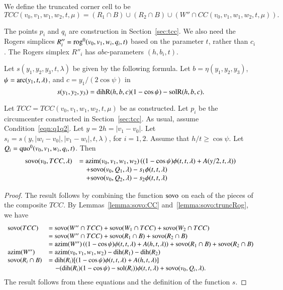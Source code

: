 \begin{definition} We define the truncated corner cell
to be
$$
TCC(v_0,v_1,w_1,w_2,t,\mu) =
(R_1\cap B)\cup (R_2\cap B) \cup (W''\cap CC(v_0,v_1,w_1,w_2,t,\mu)).
$$
\end{definition}

The points $p_i$ and
 $q_i$ are construction in Section~\ref{sec:tcc}.
We also need the Rogers simplices 
$R''_i= {\operatorname{rog}}^0(v_0,v_1,w_i,q_i,t)$ based on the parameter
$t$, rather than $c_i$.  The Rogers simplex $R''_i$
has $abc$-parameters
$(h,b_i,t)$.  

Let $s(y_1,y_2,y_3,t,\lambda)$ be given by the following formula.
Let $b = \eta(y_1,y_2,y_3)$, $\psi = \operatorname{arc}(y_1,t,\lambda)$,
and $c = y_1/(2\cos\psi)$ in
  $$
  s(y_1,y_2,y_3) = {\operatorname{dihR}}(h,b,c) (1-\cos\psi) - {\operatorname{solR}}(h,b,c).
  $$


\begin{lemma}\label{lemma:tcc}  
Let $TCC=TCC(v_0,v_1,w_1,w_2,t,\mu)$ be as constructed.
Let $p_i$ be the circumcenter constructed in Section~\ref{sec:tcc}.
As usual, assume Condition~\ref{eqn:q1q2}.  
Let $y = 2h = |v_1-v_0|$.  
Let $s_i = s(y,|w_i-v_0|,|v_1-w_i|,t,\lambda)$, for $i=1,2$.
Assume that
$h/t \ge \cos\psi$.  
Let $Q_i = {\operatorname{quo}}^0(v_0,v_1,w_i,q_i,t)$.  Then
  \begin{equation}\label{eqn:tcc}
  \begin{array}{lll}
  {\operatorname{sovo}}(v_0,TCC,\lambda) &= 
  {\operatorname{azim}}(v_0,v_1,w_1,w_2) \left((1-\cos\psi)\phi(t,t,\lambda)+
    A(y/2,t,\lambda)\right) \\
    &\quad + {\operatorname{sovo}}(v_0,Q_1,\lambda) - s_1\phi(t,t,\lambda) \\
    &\quad + {\operatorname{sovo}}(v_0,Q_2,\lambda) - s_2\phi(t,t,\lambda) \\
  \end{array}
  \end{equation}
\end{lemma}

\begin{proof}  The result follows by combining the function
${\operatorname{sovo}}$ on each of the pieces of the composite $TCC$.
By Lemmas~\ref{lemma:sovo:CC} and~\ref{lemma:sovo:truncRog},  
we have
$$
\begin{array}{lll}
  {\operatorname{sovo}}(TCC) &= {\operatorname{sovo}}(W''\cap TCC) + {\operatorname{sovo}}(W_1\cap TCC)
  + {\operatorname{sovo}}(W_2\cap TCC)\\
  &={\operatorname{sovo}}(W''\cap TCC) + {\operatorname{sovo}}(R_1\cap B)
  + {\operatorname{sovo}}(R_2\cap B)\\
  &= {\operatorname{azim}}(W'') \left((1-\cos\psi)\phi(t,t,\lambda)+
    A(h,t,\lambda)\right) 
   + {\operatorname{sovo}}(R_1\cap B)
  + {\operatorname{sovo}}(R_2\cap B)\\
  {\operatorname{azim}}(W'') &= {\operatorname{azim}}(v_0,v_1,w_1,w_2)-\operatorname{dih}(R_1)-\operatorname{dih}(R_2)\\
  {\operatorname{sovo}}(R_i\cap B) &= \operatorname{dih}(R_i) [(1-\cos\psi)\phi(t,t,\lambda)+A(h,t,\lambda)]\\
   &\quad -(\operatorname{dih}(R_i) (1-\cos\psi) - \operatorname{sol}(R_i)) \phi(t,t,\lambda) + 
   {\operatorname{sovo}}(v_0,Q_i,\lambda).
\end{array}
$$
The result follows from these equations and the definition of
the function $s$.
\end{proof}



